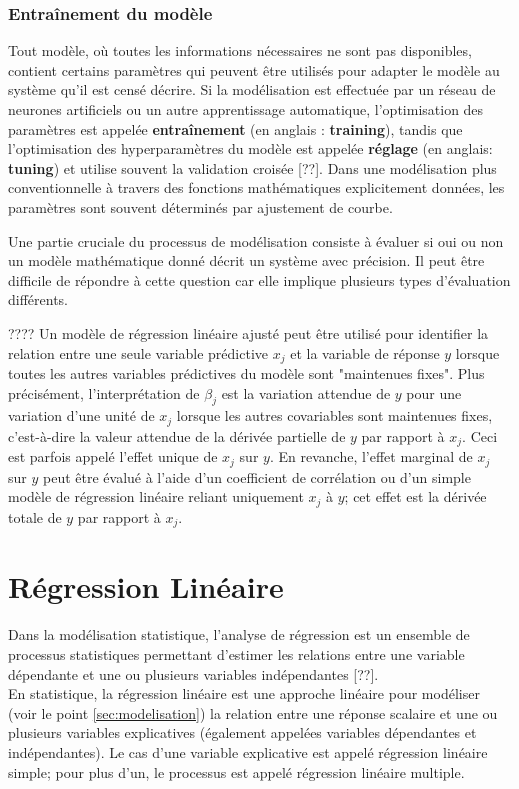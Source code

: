 	
	\subsubsection{Entraînement du modèle}
	
	Tout modèle, où toutes les informations nécessaires ne sont pas disponibles, contient certains paramètres qui peuvent être utilisés pour adapter le modèle au système qu'il est censé décrire. Si la modélisation est effectuée par un réseau de neurones artificiels ou un autre apprentissage automatique, l'optimisation des paramètres est appelée \textbf{entraînement} (en anglais : \textbf{training}), tandis que l'optimisation des hyperparamètres du modèle est appelée \textbf{réglage} (en anglais: \textbf{tuning}) et utilise souvent la validation croisée [??]. Dans une modélisation plus conventionnelle à travers des fonctions mathématiques explicitement données, les paramètres sont souvent déterminés par ajustement de courbe.
	
	
	Une partie cruciale du processus de modélisation consiste à évaluer si oui ou non un modèle mathématique donné décrit un système avec précision. Il peut être difficile de répondre à cette question car elle implique plusieurs types d'évaluation différents.
	
	????
	Un modèle de régression linéaire ajusté peut être utilisé pour identifier la relation entre une seule variable prédictive $x_j$ et la variable de réponse $y$ lorsque toutes les autres variables prédictives du modèle sont "maintenues fixes". Plus précisément, l'interprétation de $\beta_j$ est la variation attendue de $y$ pour une variation d'une unité de $x_j$ lorsque les autres covariables sont maintenues fixes, c'est-à-dire la valeur attendue de la dérivée partielle de $y$ par rapport à $x_j$. Ceci est parfois appelé l'effet unique de $x_j$ sur $y$. En revanche, l'effet marginal de $x_j$ sur $y$ peut être évalué à l'aide d'un coefficient de corrélation ou d'un simple modèle de régression linéaire reliant uniquement $x_j$ à $y$; cet effet est la dérivée totale de $y$ par rapport à $x_j$.

	\section{Régression Linéaire}
	Dans la modélisation statistique, l'analyse de régression est un ensemble de processus statistiques permettant d'estimer les relations entre une variable dépendante et une ou plusieurs variables indépendantes [??].\\
	En statistique, la régression linéaire est une approche linéaire pour modéliser (voir le point \ref{sec:modelisation}) la relation entre une réponse scalaire et une ou plusieurs variables explicatives (également appelées variables dépendantes et indépendantes). Le cas d'une variable explicative est appelé régression linéaire simple; pour plus d'un, le processus est appelé régression linéaire multiple.
	

